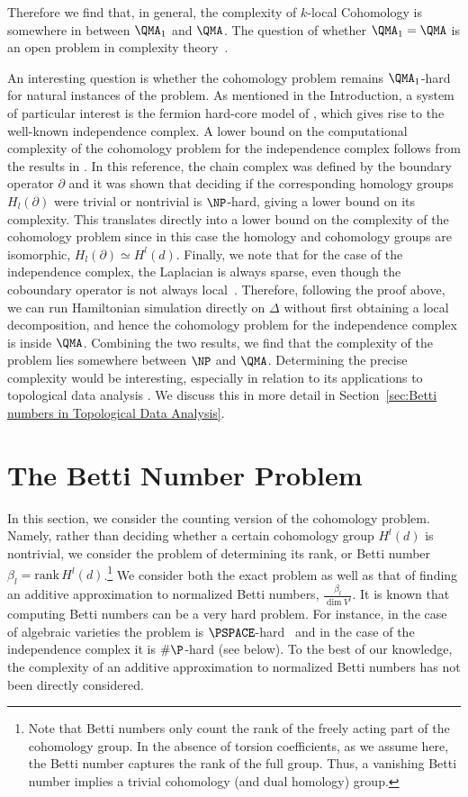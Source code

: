 \documentclass[11pt]{article}
\numberwithin{equation}{section}
\renewcommand\( {\left(}
\renewcommand\) {\right)}
\begin{document}
Therefore we find that, in general, the complexity of {\sc $k$-local Cohomology} is somewhere in between $\QMA_{1}$ and $\QMA$. The question of whether $\QMA_{1}=\QMA$ is an open problem in complexity theory~\cite{aaronson2009perfect}.


An interesting question is whether the cohomology problem remains $\QMA_{1}$-hard for natural instances of the problem. As mentioned in the Introduction, a system of particular interest is the fermion hard-core model of \cite{Fendley_2003}, which gives rise to the well-known independence complex. A lower bound on the computational complexity of the cohomology problem for the independence complex follows from the results in \cite{ADAMASZEK20168}. In this reference, the chain complex was defined by the boundary operator $\partial$ and it was shown that deciding if the corresponding homology groups $H_l(\partial)$ were trivial or nontrivial is $\NP$-hard, giving a lower bound on its complexity. This translates directly into a lower bound on the complexity of the cohomology problem since in this case the homology and cohomology groups are isomorphic, $H_l(\partial)\simeq H^l(d)$. Finally, we note that for the case of the independence complex, the Laplacian is always sparse, even though the coboundary operator is not always local~\cite{gyurik}. Therefore, following the proof above, we can run Hamiltonian simulation directly on $\Delta$ without first obtaining a local decomposition, and hence the cohomology problem for the independence complex is inside $\QMA$. Combining the two results, we find that the complexity of the problem lies somewhere between $\NP$ and $\QMA$. Determining the precise complexity would be interesting, especially in relation to its applications to topological data analysis \cite{LloydetalTDA}.  We discuss this in more detail in Section~\ref{sec:Betti numbers in Topological Data Analysis}.


\section{The Betti Number Problem}\label{sec:betti_numbers}

In this section, we consider the counting version of the cohomology problem. Namely, rather than deciding whether a certain cohomology group $H^l(d)$ is nontrivial, we consider the problem of determining its rank, or Betti number $\beta_l=\text{rank}\, H^l(d)$.\footnote{Note that Betti numbers only count the rank of the freely acting part of the cohomology group. In the absence of torsion coefficients, as we assume here, the Betti number captures the rank of the full group. Thus, a vanishing Betti number implies a trivial cohomology (and dual homology) group.} 
We consider both the exact problem as well as that of finding an  additive approximation to normalized Betti numbers, $\frac{\beta_l
}{\dim V^l}$. It is known that computing Betti numbers can be a very hard problem. For instance, in the case of  algebraic varieties the problem is $\PSPACE$-hard~\cite{scheiblechner2007complexity} and in the case of the independence complex it is $\#\P$-hard (see below). To the best of our knowledge, the complexity of an additive approximation to normalized Betti numbers has not been directly considered. 
\end{document}
